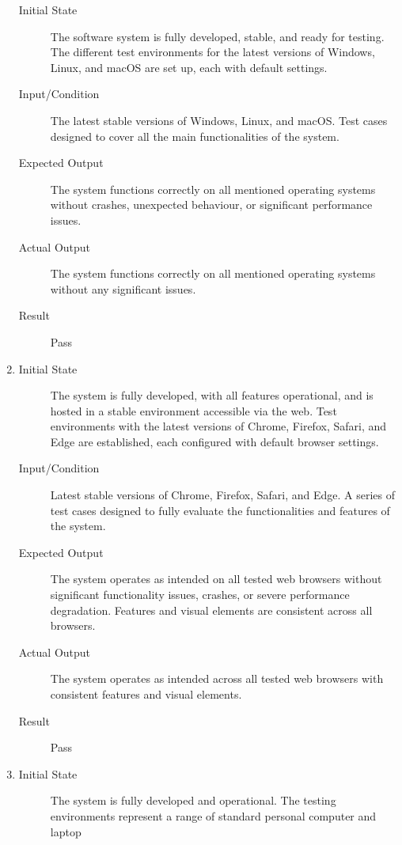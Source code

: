 \documentclass[12pt, titlepage]{article}
\begin{document}
\begin{enumerate}[NFR-T1]
\begin{description}
    \item[Initial State] The software system is fully developed, stable, and ready
      for testing. The different test environments for the latest versions of
      Windows, Linux, and macOS are set up, each with default settings.
    \item[Input/Condition] The latest stable versions of Windows, Linux, and
      macOS. Test cases designed to cover all the main functionalities of the
      system.
    \item[Expected Output] The system functions correctly on all mentioned
      operating systems without crashes, unexpected behaviour, or significant
      performance issues.
    \item[Actual Output] The system functions correctly on all mentioned operating
      systems without any significant issues.
    \item[Result] Pass
    \end{description}
  \item \label{NFRT17}
    \begin{description}
    \item[Initial State] The system is fully developed, with all features
      operational, and is hosted in a stable environment accessible via the web.
      Test environments with the latest versions of Chrome, Firefox, Safari, and
      Edge are established, each configured with default browser settings.
    \item[Input/Condition] Latest stable versions of Chrome, Firefox, Safari, and
      Edge. A series of test cases designed to fully evaluate the
      functionalities and features of the system.
    \item[Expected Output] The system operates as intended on all tested web
      browsers without significant functionality issues, crashes, or severe
      performance degradation. Features and visual elements are consistent across
      all browsers.
    \item[Actual Output] The system operates as intended across all tested web
      browsers with consistent features and visual elements.
    \item[Result] Pass
    \end{description}
  \item \label{NFRT18}
    \begin{description}
    \item[Initial State] The system is fully developed and operational. The testing
      environments represent a range of standard personal computer and laptop

\end{description}
\end{enumerate}
\end{document}
